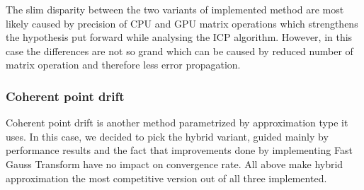 \documentclass[titlepage]{article}
\begin{document}
The slim disparity between the two variants of implemented method are most likely caused by precision of CPU and GPU matrix operations which strengthens the hypothesis put forward while analysing the ICP algorithm. However, in this case the differences are not so grand which can be caused by reduced number of matrix operation and therefore less error propagation.

\subsubsection{Coherent point drift}
Coherent point drift is another method parametrized by approximation type it uses. In this case, we decided to pick the hybrid variant, guided mainly by performance results and the fact that improvements done by implementing Fast Gauss Transform have no impact on convergence rate. All above make hybrid approximation the most competitive version out of all three implemented.
\end{document}
